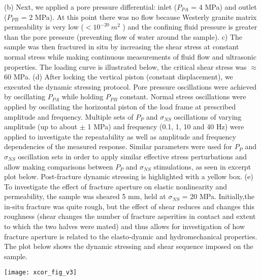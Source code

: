 \documentclass[letterpaper,10pt]{article}
\begin{document}
(b) Next, we applied a pore pressure differential: inlet ($P_{PA}$ = 4 MPa) and outlet ($P_{PB}$ = 2 MPa). At this point there was no flow because Westerly granite matrix permeability is very low ($< 10^{-20}\ m^2$ ) and the confining fluid pressure is greater than the pore pressure (preventing flow of water around the sample).
c) The sample was then fractured in situ by increasing the shear stress at constant normal stress while making continuous measurements of fluid flow and ultrasonic properties. The loading curve is illustrated below, the critical shear stress was $ \approx $60 MPa. 
(d) After locking the vertical piston (constant displacement), we executed the dynamic stressing protocol. Pore pressure oscillations were achieved by oscillating $P_{PA}$ while holding $P_{PB}$ constant. Normal stress oscillations were applied by oscillating the horizontal piston of the load frame at prescribed amplitude and frequency. Multiple sets of $P_{P}$ and $ \sigma_{NS} $ oscillations of varying amplitude (up to about $ \pm $ 1 MPa) and frequency (0.1, 1, 10 and 40 Hz) were applied to investigate the repeatability as well as amplitude and frequency dependencies of the measured response. Similar parameters were used for $P_{P}$ and $ \sigma_{NS} $ oscillation sets in order to apply similar effective stress perturbations and allow making comparisons between $P_{P}$ and $ \sigma_{NS} $ stimulations, as seen in excerpt plot below. Post-fracture dynamic stressing is highlighted with a yellow box. 
(e) To investigate the effect of fracture aperture on elastic nonlinearity and permeability, the sample was sheared 5 mm, held at $ \sigma_{NS} $ = 20 MPa. Initially,the in-situ fracture was quite rough, but the effect of shear reduces and changes this roughness (shear changes the number of fracture asperities in contact and extent to which the two halves were mated) and thus allows for investigation of how fracture aperture is related to the elasto-dyamic and hydromechanical properties. The plot below shows the dynamic stressing and shear sequence imposed on the sample.

\newpage

\begin{figure*}[ht]
	\centering
	\texttt{[image: xcor\_fig\_v3]}
	\caption[]{(a) Excerpt from run4 of experiment p4966 shows part of a 1 Hz, 1 MPa normal stress oscillation (red) and the concurrent raw ultrasonic waveforms (grey). The number of waveforms in the waterfall plot has been decimated version for clarity. (b) Time shift was calculated by cross-correlating the waveforms to a reference waveform. (c) An example of a reference, unperturbed, waveform (green) and perturbed waveform (dashed yellow) highlights
		the similarity. (d) The maximum linear correlation between the reference and perturbed waveforms from cross-correlation is used to determine the time shift. The inset shows improvement of time shift calculations with a 2nd order polynomial fitting procedure.}
	\label{fig:xcor_poly}
\end{figure*}
\end{document}
